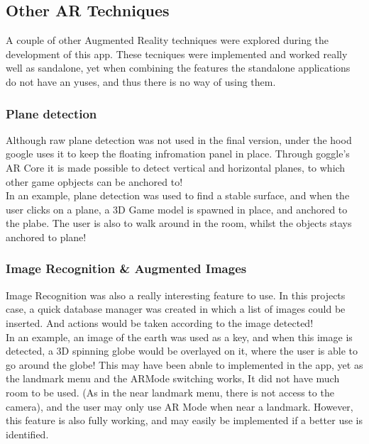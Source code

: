  \subsection{Other AR Techniques}
 A couple of other Augmented Reality techniques were explored during the development of this app. 
 These tecniques were implemented and worked really well as sandalone, yet when combining the features 
 the standalone applications do not have an yuses, and thus there is no way of using them. 
 \subsubsection{Plane detection}
 Although raw plane detection was not used in the final version, under the hood google uses it to keep the 
 floating infromation panel in place. Through goggle's AR Core it is made possible to detect vertical 
 and horizontal planes, to which other game opbjects can be anchored to!\\

 In an example, plane detection was used to find a stable surface, and when the user clicks on a 
 plane, a 3D Game model is spawned in place, and anchored to the plabe. The user is also to walk around 
 in the room, whilst the objects stays anchored to plane! 

 \subsubsection{Image Recognition \& Augmented Images}
 Image Recognition was also a really interesting feature to use. 
 In this projects case, a quick database manager was created in which a list of images could
  be inserted. And actions would be taken according to the image detected!\\

In an example, an image of the earth was used as a key, and when this image is detected, a 3D spinning 
globe would be overlayed on it, where the user is able to go around the globe!
This may have been abnle to implemented in the app, yet as the landmark menu and the ARMode switching 
works, It did not have much room to be used. (As in the near landmark menu, there is 
not access to the camera), and the user may only use AR Mode when near a landmark. However, this 
feature is also fully working, and may easily be implemented if a better use is identified. 

